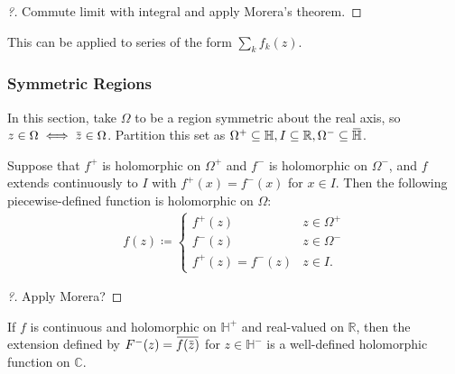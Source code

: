 \begin{proof}[?]

Commute limit with integral and apply Morera's theorem.

\end{proof}

\begin{remark}

This can be applied to series of the form \(\sum_k f_k(z)\).

\end{remark}

\hypertarget{symmetric-regions}{%
\subsubsection{Symmetric Regions}\label{symmetric-regions}}

In this section, take \(\Omega\) to be a region symmetric about the real
axis, so
\(z\in \Omega \iff \mkern 1.5mu\overline{\mkern-1.5muz\mkern-1.5mu}\mkern 1.5mu \in \Omega\).
Partition this set as
\(\Omega^+ \subseteq {\mathbb{H}}, I \subseteq {\mathbb{R}}, \Omega^- \subseteq \mkern 1.5mu\overline{\mkern-1.5mu{\mathbb{H}}\mkern-1.5mu}\mkern 1.5mu\).

\begin{theorem}

Suppose that \(f^+\) is holomorphic on \(\Omega^+\) and \(f^-\) is
holomorphic on \(\Omega^-\), and \(f\) extends continuously to \(I\)
with \(f^+(x) = f^-(x)\) for \(x\in I\). Then the following
piecewise-defined function is holomorphic on \(\Omega\):
\begin{align*}
f(z) 
\coloneqq
\begin{cases}
f^+(z) & z\in \Omega^+ 
\\
f^-(z) & z\in \Omega^-
\\
f^+(z) = f^-(z) & z\in I.
\end{cases}
\end{align*}

\end{theorem}

\begin{proof}[?]

Apply Morera?

\end{proof}

\begin{theorem}\label{SchwarzReflection}

If \(f\) is continuous and holomorphic on \({\mathbb{H}}^+\) and
real-valued on \({\mathbb{R}}\), then the extension defined by
\(F^-(z) = \mkern 1.5mu\overline{\mkern-1.5muf(\mkern 1.5mu\overline{\mkern-1.5muz\mkern-1.5mu}\mkern 1.5mu)\mkern-1.5mu}\mkern 1.5mu\)
for \(z\in {\mathbb{H}}^-\) is a well-defined holomorphic function on
\({\mathbb{C}}\).

\end{theorem}


